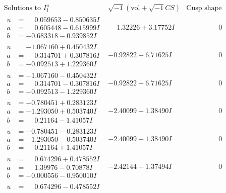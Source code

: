 \documentclass[1p]{elsarticle_modified}
\theoremstyle{definition}
\newcommand{\I}{\sqrt{-1}}
\begin{document}
$$\begin{array}{c|c|c}
\text{Solutions to }I^u_{1}& \I (\text{vol} + \sqrt{-1}CS) & \text{Cusp shape}\\
 \hline 
\begin{aligned}
u &= \phantom{-}0.059653 - 0.850635 I \\
a &= \phantom{-}0.605448 - 0.615999 I \\
b &= -0.683318 - 0.939852 I\end{aligned}
 & \phantom{-}1.32226 + 3.17752 I & \phantom{-0.000000 } 0 \\ \hline\begin{aligned}
u &= -1.067160 + 0.450432 I \\
a &= \phantom{-}0.314701 + 0.307816 I \\
b &= -0.092513 + 1.229360 I\end{aligned}
 & -0.92822 - 6.71625 I & \phantom{-0.000000 } 0 \\ \hline\begin{aligned}
u &= -1.067160 - 0.450432 I \\
a &= \phantom{-}0.314701 - 0.307816 I \\
b &= -0.092513 - 1.229360 I\end{aligned}
 & -0.92822 + 6.71625 I & \phantom{-0.000000 } 0 \\ \hline\begin{aligned}
u &= -0.780451 + 0.283123 I \\
a &= -1.293050 + 0.503740 I \\
b &= \phantom{-}0.21164 - 1.41057 I\end{aligned}
 & -2.40099 - 1.38490 I & \phantom{-0.000000 } 0 \\ \hline\begin{aligned}
u &= -0.780451 - 0.283123 I \\
a &= -1.293050 - 0.503740 I \\
b &= \phantom{-}0.21164 + 1.41057 I\end{aligned}
 & -2.40099 + 1.38490 I & \phantom{-0.000000 } 0 \\ \hline\begin{aligned}
u &= \phantom{-}0.674296 + 0.478552 I \\
a &= \phantom{-}1.39976 - 0.70878 I \\
b &= -0.000556 - 0.950010 I\end{aligned}
 & -2.42144 + 1.37494 I & \phantom{-0.000000 } 0 \\ \hline\begin{aligned}
u &= \phantom{-}0.674296 - 0.478552 I \\

\end{aligned}
\end{array}$$
\end{document}

